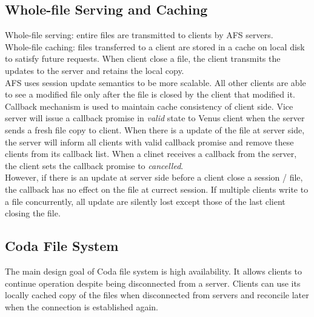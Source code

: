 \begin{multicols*}{2}
\subsection{Whole-file Serving and Caching}

\noindent Whole-file serving: entire files are transmitted to clients by AFS servers.\\

\noindent Whole-file caching: files transferred to a client are stored in a cache on local disk to satisfy future requests. When client close a file, the client transmits the updates to the server and retains the local copy.\\

\noindent AFS uses session update semantics to be more scalable. All other clients are able to see a modified file only after the file is closed by the client that modified it.\\

\noindent Callback mechanism is used to maintain cache consistency of client side. Vice server will issue a callback promise in \textit{valid} state to Venus client when the server sends a fresh file copy to client. When there is a update of the file at server side, the server will inform all clients with valid callback promise and remove these clients from its callback list. When a clinet receives a callback from the server, the client sets the callback promise to \textit{cancelled}.\\

\noindent However, if there is an update at server side before a client close a session / file, the callback has no effect on the file at currect session. If multiple clients write to a file concurrently, all update are silently lost except those of the last client closing the file. 

\subsection{Coda File System}

\noindent The main design goal of Coda file system is high availability. It allows clients to continue operation despite being disconnected from a server. Clients can use its locally cached copy of the files when disconnected from servers and reconcile later when the connection is established again. \\


\end{multicols*}
